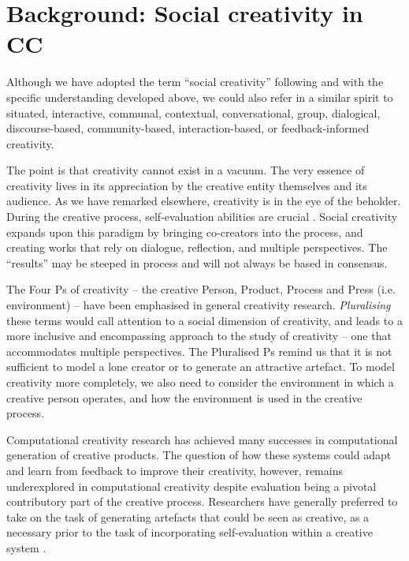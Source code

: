 \section{Background: Social creativity in CC}
\label{background}

Although we have adopted the term ``social creativity'' following
\cite{saunders12} and with the specific understanding developed above,
we could also refer in a similar spirit to situated, interactive,
communal, contextual, conversational, group, dialogical,
discourse-based, community-based, interaction-based, or
feedback-informed creativity.

The point is that creativity cannot exist in a vacuum.  The very
essence of creativity lives in its appreciation by the creative entity
themselves and its audience.  As we have remarked elsewhere,
creativity is in the eye of the beholder.  During the creative
process, self-evaluation abilities are crucial
\cite{poincare29,csik88}. Social creativity expands upon this
paradigm by bringing co-creators into the process, and creating works
that rely on dialogue, reflection, and multiple perspectives. The
``results'' may be steeped in process and will not always be based in
consensus.

The Four Ps of creativity -- the creative Person, Product, Process and
Press (i.e. environment) \cite{rhodes61,mackinnon70} -- have been
emphasised in general creativity research.  \emph{Pluralising} these
terms would call attention to a social dimension of creativity, and
leads to a more inclusive and encompassing approach to the study of
creativity -- one that accommodates multiple perspectives. The
Pluralised Ps remind us that it is not sufficient to model a lone
creator or to generate an attractive artefact.  To model creativity
more completely, we also need to consider the environment in which a
creative person operates, and how the environment is used in the
creative process.

Computational creativity research has achieved many successes in
computational generation of creative products. The question of how
these systems could adapt and learn from feedback to improve their
creativity, however, remains underexplored in computational creativity
despite evaluation being a pivotal contributory part of the creative
process. Researchers have generally preferred to take on the task of
generating artefacts that could be seen as creative, as a necessary
prior to the task of incorporating self-evaluation within a creative
system \cite{jordanous11iccc}.


